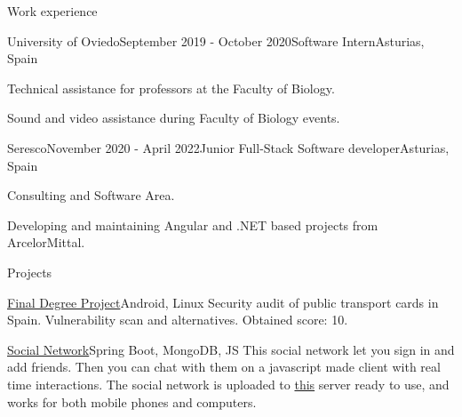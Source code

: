\documentclass{resume} %
\begin{document}
\begin{rSection}{Work experience}


\begin{rSubsection}{University of Oviedo}{September 2019 - October 2020}{Software Intern}{Asturias, Spain}
\item Technical assistance for professors at the Faculty of Biology.
\item Sound and video assistance during Faculty of Biology events.
\end{rSubsection}

\begin{rSubsection}{Seresco}{November 2020 - April 2022}{Junior Full-Stack Software developer}{Asturias, Spain}
\item Consulting and Software Area.
\item Developing and maintaining Angular and .NET based projects from ArcelorMittal.
\end{rSubsection}

\end{rSection}


\begin{rSection}{Projects}


\begin{rSubsection}{\href{https://github.com/alexl0/tfg}{Final Degree Project}}{Android, Linux}{}{}
Security audit of public transport cards in Spain. Vulnerability scan and alternatives.
Obtained score: 10.
\end{rSubsection}

\begin{rSubsection}{\href{https://chatwithyouwant.herokuapp.com}{Social Network}}{Spring Boot, MongoDB, JS}{}{}
This social network let you sign in and add friends. Then you can chat with them on a javascript made client with real time interactions.
The social network is uploaded to \href{https://chatwithyouwant.herokuapp.com}{this} server ready to use, and works for both mobile phones and computers.
\end{rSubsection}


\end{rSection}
\end{document}
